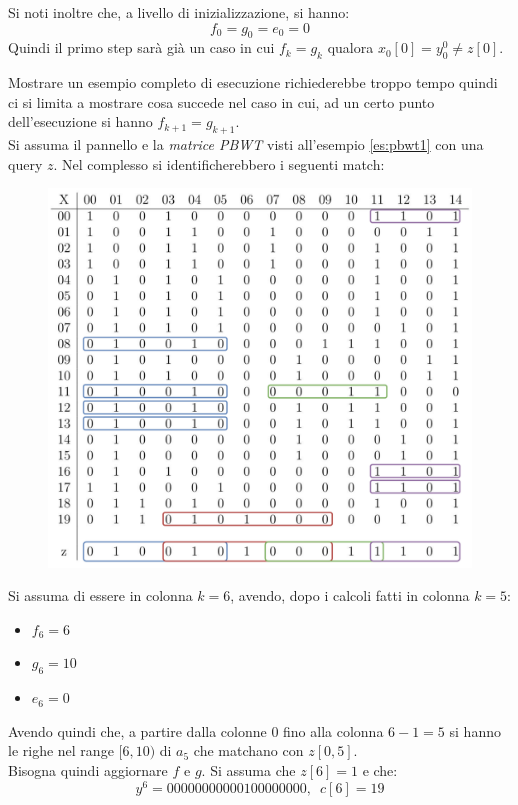 Si noti inoltre che, a livello di inizializzazione, si hanno:
\[f_0=g_0=e_0=0\]
Quindi il primo step sarà già un caso in cui $f_k=g_k$ qualora $x_0[0]=y_0^0\neq
z[0]$. 
\begin{esempio}
  \label{es:algo5}
  Mostrare un esempio completo di esecuzione richiederebbe troppo tempo quindi
  ci si limita a mostrare cosa succede nel caso in cui, ad un certo punto
  dell'esecuzione si hanno $f_{k+1}=g_{k+1}$.\\
  Si assuma il pannello e la \textit{matrice PBWT} visti all'esempio
  \ref{es:pbwt1} con una query $z$. Nel complesso si identificherebbero i
  seguenti match:
  \begin{figure}[H]
    \centering
    \includegraphics[scale = 0.365]{img/pbwtmatch.pdf}
  \end{figure}
  Si assuma di essere in colonna $k=6$, avendo, dopo i calcoli fatti in colonna
  $k=5$: 
  \begin{itemize}
    \item $f_6=6$
    \item $g_6=10$
    \item $e_6=0$
  \end{itemize}
  Avendo quindi che, a partire dalla colonne $0$ fino alla colonna $6-1=5$ si
  hanno le righe nel range $[6,10)$ di $a_{5}$ che matchano con $z[0,5]$.\\
  Bisogna quindi aggiornare $f$ e $g$. Si assuma che $z[6]=1$ e che:
  \[y^6=00000000000100000000,\,\,\,c[6]=19\]

\end{esempio}

